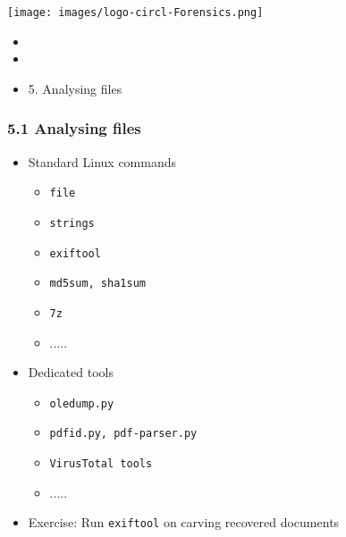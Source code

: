 %
%



\begin{frame}
    \texttt{[image: images/logo-circl-Forensics.png]}
    \begin{itemize}
        \item[]
        \item[]
        \item[] 5. Analysing files
    \end{itemize}
\end{frame}


\begin{frame}[fragile]
  \frametitle{5.1 Analysing files}
    \begin{itemize}
       \item Standard Linux commands
            \begin{itemize}
                \item[] \texttt{file}
                \item[] \texttt{strings}
                \item[] \texttt{exiftool}
                \item[] \texttt{md5sum, sha1sum}
                \item[] \texttt{7z}
                \item[] .....
            \end{itemize}
       \item Dedicated tools
            \begin{itemize}
                \item[] \texttt{oledump.py}
                \item[] \texttt{pdfid.py, pdf-parser.py}
                \item[] \texttt{VirusTotal tools}
                \item[] .....
            \end{itemize}
       \item Exercise: Run \texttt{exiftool} on carving recovered documents
    \end{itemize}
\end{frame}


